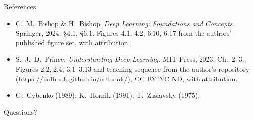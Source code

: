 \documentclass[aspectratio=169, 11pt]{beamer}
\newcommand{\nosrc}{}       %
\begin{document}
\begin{frame}{References}
  \nosrc
  \footnotesize
  \begin{itemize}
    \item C.~M.~Bishop \& H.~Bishop. \textit{Deep
          Learning: Foundations and Concepts.} Springer,
          2024. \S4.1, \S6.1. Figures 4.1, 4.2, 6.10,
          6.17 from the authors' published figure set,
          with attribution.
    \item S.~J.~D.~Prince. \textit{Understanding Deep
          Learning.} MIT Press, 2023. Ch.~2--3. Figures
          2.2, 2.4, 3.1--3.13 and teaching sequence from
          the author's repository
          (\url{https://udlbook.github.io/udlbook/}),
          CC BY-NC-ND, with attribution.
    \item G.~Cybenko (1989); K.~Hornik (1991);
          T.~Zaslavsky (1975).
  \end{itemize}
\end{frame}

\begin{frame}[standout]
  \nosrc
  Questions?
\end{frame}
\end{document}
